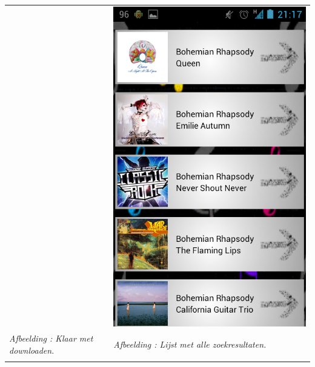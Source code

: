 \documentclass[11pt,a4paper]{article}
\newcounter{figc}
\newcommand{\figID} {%
   \stepcounter{figc}%
   \thefigc}
\begin{document}
{\begin{tabular} {p{7cm} >{\centering\arraybackslash}p{7cm}@{\hskip 0.5in}}
		& \includegraphics[scale=0.26]{Pictures/Screenshot_2013-05-24-21-17-57.png} \\
		
		\centering \small \textit{Afbeelding \figID : Klaar met downloaden.}  \normalsize
		&  \small \textit{Afbeelding \figID : Lijst met alle zoekresultaten.} \\  \normalsize
		\vspace{1pt} & \vspace{1pt} \\
		

\end{tabular}}
\end{document}
